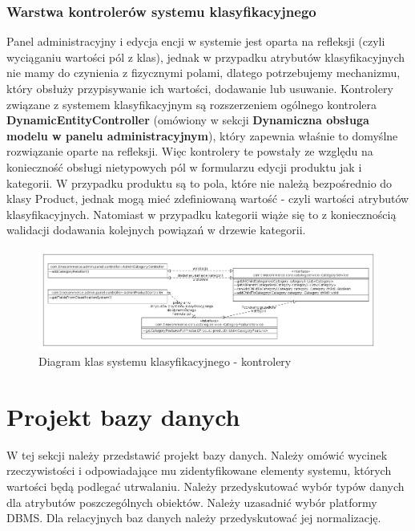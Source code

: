 \subsubsection{Warstwa kontrolerów systemu klasyfikacyjnego}
Panel administracyjny i edycja encji w systemie jest oparta na refleksji (czyli wyciąganiu wartości pól z klas), jednak w przypadku atrybutów klasyfikacyjnych nie mamy do czynienia z fizycznymi polami, dlatego potrzebujemy mechanizmu, który obsłuży przypisywanie ich wartości, dodawanie lub usuwanie. Kontrolery związane z systemem klasyfikacyjnym są rozszerzeniem ogólnego kontrolera \textbf{DynamicEntityController} (omówiony w sekcji \textbf{Dynamiczna obsługa modelu w panelu administracyjnym}), który zapewnia właśnie to domyślne rozwiązanie oparte na refleksji. Więc kontrolery te powstały ze względu na konieczność obsługi nietypowych pól w formularzu edycji produktu jak i kategorii. W przypadku produktu są to pola, które nie należą bezpośrednio do klasy Product, jednak mogą mieć zdefiniowaną wartość - czyli wartości atrybutów klasyfikacyjnych. Natomiast w przypadku kategorii wiąże się to z koniecznością walidacji dodawania kolejnych powiązań w drzewie kategorii. 
\begin{figure}
	\begin{center}
		\includegraphics[scale=0.4,angle=270]{klasy_kontrolery_sysKlas.png}
	\end{center}
	\caption{{\color{black}Diagram klas systemu klasyfikacyjnego - kontrolery}} \label{klasy_kontrolery_sysKlas}
\end{figure}

\section{Projekt bazy danych}

W tej sekcji należy przedstawić projekt bazy danych. Należy omówić wycinek rzeczywistości i odpowiadające mu zidentyfikowane elementy systemu, których wartości będą podlegać utrwalaniu. Należy przedyskutować wybór typów danych dla atrybutów poszczególnych obiektów. Należy uzasadnić wybór platformy DBMS. Dla relacyjnych baz danych należy przedyskutować jej normalizację.

